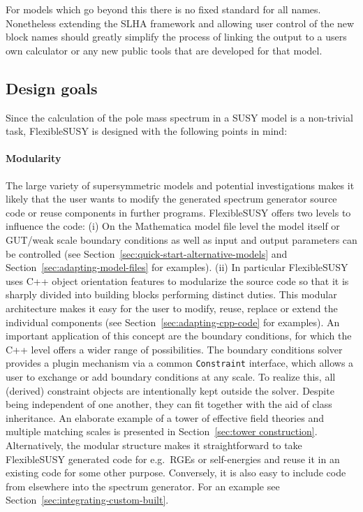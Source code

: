 \documentclass[final,3p,11pt,pdflatex]{elsarticle}
\makeatletter
\newcommand{\fs}{FlexibleSUSY\@\xspace}
\newcommand{\mathematica}{Mathematica\xspace}
\newcommand{\code}[1]{\lstinline|#1|}  %
\newcommand{\secref}[1]{Section~\ref{#1}}
\makeatother
\begin{document}
For models which go beyond this there is no fixed standard for all
names.  Nonetheless extending the SLHA framework and allowing user
control of the new block names should greatly simplify the process of
linking the output to a users own calculator or any new public tools
that are developed for that model.  

\subsection{Design goals}

Since the calculation of the pole mass spectrum in a SUSY model is a
non-trivial task, \fs is designed with the following points in mind:

\paragraph{Modularity}

The large variety of supersymmetric models and potential
investigations makes it likely that the user wants to modify the
generated spectrum generator source code or reuse components in
further programs.  \fs offers two levels to influence the code: (i) On
the \mathematica model file level the model itself or GUT/weak scale
boundary conditions as well as input and output parameters can be
controlled (see \secref{sec:quick-start-alternative-models} and
\secref{sec:adapting-model-files} for examples).  (ii) In particular
\fs uses C++ object orientation features to modularize the source code
so that it is sharply divided into building blocks performing
distinct duties.
This modular architecture makes it easy
for the user to modify, reuse, replace or
extend the individual components (see \secref{sec:adapting-cpp-code}
for examples).  An important application of this concept are the
boundary conditions, for which the C++ level offers a wider range of
possibilities.  The boundary conditions solver provides a plugin
mechanism via a common \code{Constraint} interface, which allows a
user to exchange or add boundary conditions at any scale.
To realize this, all (derived) constraint objects are intentionally
kept outside the solver.  Despite being independent of one another,
they can fit together with the aid of class inheritance.  An
elaborate example of a tower of effective field theories and multiple
matching scales is presented in \secref{sec:tower construction}.
Alternatively, the modular structure makes it straightforward to take
\fs generated code for e.g.\ RGEs or self-energies and reuse it in an
existing code for some other purpose.  Conversely, it is also easy to
include code from elsewhere into the spectrum generator.  For an
example see \secref{sec:integrating-custom-built}.
\end{document}

